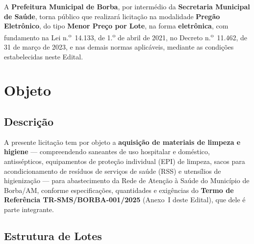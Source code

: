 \documentclass[12pt,a4paper]{article}
\newcommand{\trRef}{TR-SMS/BORBA-001/2025}
\begin{document}
\medskip
\noindent A \textbf{Prefeitura Municipal de Borba}, por intermédio da
\textbf{Secretaria Municipal de Saúde}, torna público que realizará licitação na
modalidade \textbf{Pregão Eletrônico}, do tipo \textbf{Menor Preço por Lote}, na
forma \textbf{eletrônica}, com fundamento na Lei n.\textsuperscript{o}~14.133, de
1.\textsuperscript{o} de abril de 2021, no Decreto n.\textsuperscript{o}~11.462, de
31 de março de 2023, e nas demais normas aplicáveis, mediante as condições
estabelecidas neste Edital.

\section{Objeto}

\subsection{Descrição}

A presente licitação tem por objeto a \textbf{aquisição de materiais de limpeza e
higiene} --- compreendendo saneantes de uso hospitalar e doméstico, antissépticos,
equipamentos de proteção individual (EPI) de limpeza, sacos para acondicionamento
de resíduos de serviços de saúde (RSS) e utensílios de higienização --- para
abastecimento da Rede de Atenção à Saúde do Município de Borba/AM, conforme
especificações, quantidades e exigências do \textbf{Termo de Referência \trRef}
(Anexo~I deste Edital), que dele é parte integrante.

\subsection{Estrutura de Lotes}
\end{document}
